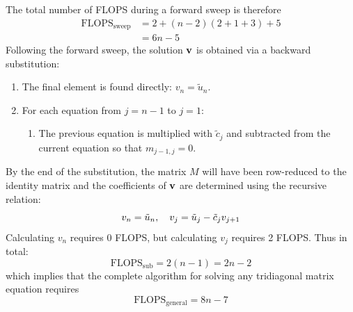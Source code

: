 \documentclass[reprint,english]{revtex4-1}
\begin{document}
The total number of FLOPS during a forward sweep is therefore
\begin{align}
\text{FLOPS}_{\text{sweep}}&=2+(n-2)(2+1+3)+5\nonumber\\
&=6n-5
\end{align}
Following the forward sweep, the solution \(\vb{v}\) is obtained via a backward substitution:
\begin{enumerate}
\item The final element is found directly: \(v_n=\tilde{u}_n\).
\item For each equation from \(j=n-1\) to \(j=1\):
\begin{enumerate}
	\item The previous equation is multiplied with \(\tilde{c}_j\) and subtracted from the current equation so that \(m_{j-1,j}=0\).
\end{enumerate}
\end{enumerate}
By the end of the substitution, the matrix \(M\) will have been row-reduced to the identity matrix and the coefficients of \(\vb{v}\) are determined using the recursive relation:
\begin{equation}
v_n=\tilde{u}_n\qc v_j=\tilde{u}_j-\tilde{c}_jv_{j+1}
\end{equation}
Calculating \(v_n\) requires 0 FLOPS, but calculating \(v_j\) requires 2 FLOPS. Thus in total:
\begin{equation}
\text{FLOPS}_{\text{sub}}=2(n-1)=2n-2
\end{equation}
which implies that the complete algorithm for solving any tridiagonal matrix equation requires
\begin{equation}
\text{FLOPS}_{\text{general}}=8n-7
\end{equation}
\end{document}
